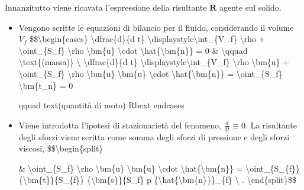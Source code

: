 \documentclass[letterpaper,10pt,italian]{jupyterBook}
\begin{document}
\sphinxAtStartPar
Innanzitutto viene ricavata l’espressione della risultante \(\bm{R}\)
agente sul solido.
\begin{itemize}
\item {} 
\sphinxAtStartPar
Vengono scritte le equazioni di bilancio per il fluido, considerando
il volume \(V_f\) \$\$\textbackslash{}begin\{cases\}
\textbackslash{}dfrac\{d\}\{d t\} \textbackslash{}displaystyle\textbackslash{}int\_\{V\_f\} \textbackslash{}rho + \textbackslash{}oint\_\{S\_f\} \textbackslash{}rho \textbackslash{}bm\{u\} \textbackslash{}cdot \textbackslash{}hat\{\textbackslash{}bm\{n\}\} = 0 \& \textbackslash{}qquad \textbackslash{}text\{(massa)\} \textbackslash{}
\textbackslash{}dfrac\{d\}\{d t\} \textbackslash{}displaystyle\textbackslash{}int\_\{V\_f\} \textbackslash{}rho \textbackslash{}bm\{u\} + \textbackslash{}oint\_\{S\_f\} \textbackslash{}rho \textbackslash{}bm\{u\} \textbackslash{}bm\{u\} \textbackslash{}cdot \textbackslash{}hat\{\textbackslash{}bm\{n\}\} =
\textbackslash{}oint\_\{S\_f\} \textbackslash{}bm\{t\_n\} = 0

\begin{sphinxVerbatim}[commandchars=\\\{\}]
    \PYGZam{} \PYGZbs{}qquad \PYGZbs{}text\PYGZob{}(quantità di moto)\PYGZcb{}  \PYGZpc{}\PYGZbs{}Rb\PYGZca{}\PYGZob{}ext\PYGZcb{}
  \PYGZbs{}end\PYGZob{}cases\PYGZcb{}\PYGZdl{}\PYGZdl{}
\end{sphinxVerbatim}

\item {} 
\sphinxAtStartPar
Viene introdotta l’ipotesi di stazionarietà del fenomeno,
\(\frac{d}{dt}\equiv 0\). La risultante degli sforzi viene scritta
come somma degli sforzi di pressione e degli sforzi viscosi,
\$\$\textbackslash{}begin\{split\}

\sphinxAtStartPar
\& \textbackslash{}oint\_\{S\_f\} \textbackslash{}rho \textbackslash{}bm\{u\} \textbackslash{}bm\{u\} \textbackslash{}cdot \textbackslash{}hat\{\textbackslash{}bm\{n\}\}
= \textbackslash{}oint\_\{S\_\{f\}\}  \{\textbackslash{}bm\{t\}\}\{S\_\{f\}\}  \{\textbackslash{}bm\{s\}\}\{S\_f\} p \{\textbackslash{}hat\{\textbackslash{}bm\{n\}\}\}\_\{f\} \textbackslash{} .
\textbackslash{}end\{split\}\$\$


\end{itemize}
\end{document}

